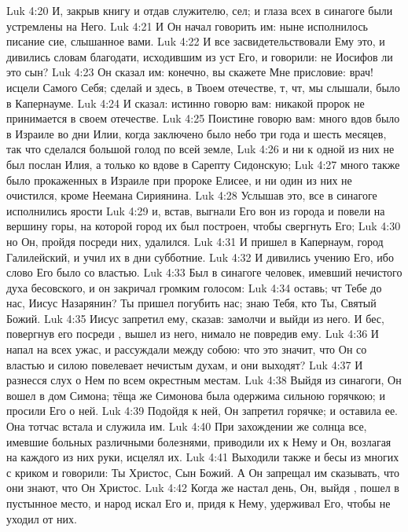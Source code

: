 \vs Luk 4:20 И, закрыв книгу и отдав служителю, сел; и глаза всех в синагоге были устремлены на Него.
\vs Luk 4:21 И Он начал говорить им: ныне исполнилось писание сие, слышанное вами.
\vs Luk 4:22 И все засвидетельствовали Ему это, и дивились словам благодати, исходившим из уст Его, и говорили: не Иосифов ли это сын?
\vs Luk 4:23 Он сказал им: конечно, вы скажете Мне присловие: врач! исцели Самого Себя; сделай и здесь, в Твоем отечестве, т, чт, мы слышали, было в Капернауме.
\vs Luk 4:24 И сказал: истинно говорю вам: никакой пророк не принимается в своем отечестве.
\vs Luk 4:25 Поистине говорю вам: много вдов было в Израиле во дни Илии, когда заключено было небо три года и шесть месяцев, так что сделался большой голод по всей земле,
\vs Luk 4:26 и ни к одной из них не был послан Илия, а только ко вдове в Сарепту Сидонскую;
\vs Luk 4:27 много также было прокаженных в Израиле при пророке Елисее, и ни один из них не очистился, кроме Неемана Сириянина.
\vs Luk 4:28 Услышав это, все в синагоге исполнились ярости
\vs Luk 4:29 и, встав, выгнали Его вон из города и повели на вершину горы, на которой город их был построен, чтобы свергнуть Его;
\vs Luk 4:30 но Он, пройдя посреди них, удалился.
\rsbpar\vs Luk 4:31 И пришел в Капернаум, город Галилейский, и учил их в дни субботние.
\vs Luk 4:32 И дивились учению Его, ибо слово Его было со властью.
\vs Luk 4:33 Был в синагоге человек, имевший нечистого духа бесовского, и он закричал громким голосом:
\vs Luk 4:34 оставь; чт Тебе до нас, Иисус Назарянин? Ты пришел погубить нас; знаю Тебя, кто Ты, Святый Божий.
\vs Luk 4:35 Иисус запретил ему, сказав: замолчи и выйди из него. И бес, повергнув его посреди , вышел из него, нимало не повредив ему.
\vs Luk 4:36 И напал на всех ужас, и рассуждали между собою: что это значит, что Он со властью и силою повелевает нечистым духам, и они выходят?
\vs Luk 4:37 И разнесся слух о Нем по всем окрестным местам.
\rsbpar\vs Luk 4:38 Выйдя из синагоги, Он вошел в дом Симона; тёща же Симонова была одержима сильною горячкою; и просили Его о ней.
\vs Luk 4:39 Подойдя к ней, Он запретил горячке; и оставила ее. Она тотчас встала и служила им.
\vs Luk 4:40 При захождении же солнца все, имевшие больных различными болезнями, приводили их к Нему и Он, возлагая на каждого из них руки, исцелял их.
\vs Luk 4:41 Выходили также и бесы из многих с криком и говорили: Ты Христос, Сын Божий. А Он запрещал им сказывать, что они знают, что Он Христос.
\rsbpar\vs Luk 4:42 Когда же настал день, Он, выйдя , пошел в пустынное место, и народ искал Его и, придя к Нему, удерживал Его, чтобы не уходил от них.
